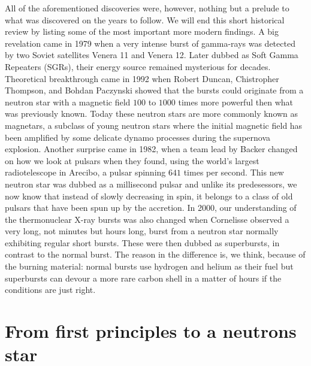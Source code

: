 %
%
All of the aforementioned discoveries were, however, nothing but a prelude to what was discovered on the years to follow.
We will end this short historical review by listing some of the most important more modern findings.
A big revelation came in 1979 when a very intense burst of gamma-rays was detected by two Soviet satellites Venera 11 and Venera 12.\cite{MGI79}
Later dubbed as Soft Gamma Repeaters (SGRs), their energy source remained mysterious for decades.
Theoretical breakthrough came in 1992 when Robert Duncan, Chistropher Thompson, and Bohdan Paczynski showed that the bursts could originate from a neutron star with a magnetic field $100$ to $1000$ times more powerful then what was previously known.\cite{DT92}
Today these neutron stars are more commonly known as magnetars, a subclass of young neutron stars where the initial magnetic field has been amplified by some delicate dynamo processes during the supernova explosion.
Another surprise came in 1982, when a team lead by Backer changed on how we look at pulsars when they found, using the world's largest radiotelescope in Arecibo, a pulsar spinning $641$ times per second.\cite{BKH82}
This new neutron star was dubbed as a millisecond pulsar and unlike its predesessors, we now know that instead of slowly decreasing in spin, it belongs to a class of old pulsars that have been spun up by the accretion.
In 2000, our understanding of the thermonuclear X-ray bursts was also changed when Cornelisse observed a very long, not minutes but hours long, burst from a neutron star normally exhibiting regular short bursts.\cite{CHK00}
These were then dubbed as superbursts, in contrast to the normal burst.
The reason in the difference is, we think, because of the burning material:
normal bursts use hydrogen and helium as their fuel but superbursts can devour a more rare carbon shell in a matter of hours if the conditions are just right.




\section{From first principles to a neutrons star}

